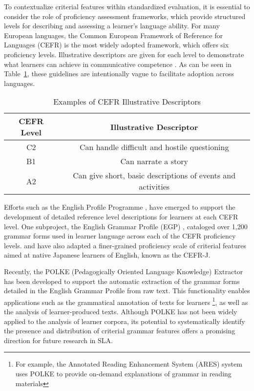 

To contextualize criterial features within standardized evaluation, it is essential to consider the role of
proficiency assessment frameworks, which provide structured levels for describing and assessing a learner's language
ability. For many European languages, the Common European Framework of Reference for Languages (CEFR) is the most
widely adopted framework, which offers six proficiency levels. Illustrative
descriptors are given for each level to demonstrate what learners can achieve in communicative
competence \citep{CEFR2020}. As can be seen in Table~\ref{tab:cefr-descriptors}, these guidelines are intentionally
vague to facilitate
adoption
across
languages.

\begin{table}
\centering
\begin{tabular}{cc}
\hline \textbf{CEFR Level} & \textbf{Illustrative Descriptor} \\ \hline
C2 & Can handle difficult and hostile questioning \\
B1  & Can narrate a story \\
A2 & Can give short, basic descriptions of events and activities \\
\hline
\end{tabular}
\caption{\label{tab:cefr-descriptors} Examples of CEFR Illustrative Descriptors}
\end{table}

Efforts such
as the English Profile Programme \citep{Saville2010}, have emerged to support the development of detailed reference
level
descriptions
for learners at each CEFR level. One subproject, the English Grammar Profile (EGP) \citep{okeeffe2017},
cataloged over 1,200 grammar forms used in learner language across each of the CEFR proficiency levels.
\citet{tono2018} and \citet{ishii2016} have
also adapted a
finer-grained
proficiency scale of criterial features aimed at native Japanese learners of English, known as the CEFR-J.

Recently, the POLKE (Pedagogically Oriented Language Knowledge) Extractor
\citep{POLKE} has been developed to support the automatic extraction of the grammar forms detailed in the English
Grammar
Profile from raw text. This functionality enables applications such as the grammatical annotation of texts for
learners
\footnote{For example, the Annotated Reading Enhancement System (ARES) \citep{lee2024} system uses POLKE to provide on-demand explanations of grammar in reading materials}, as well as the analysis of learner-produced texts. Although POLKE has not been widely applied to the analysis of learner corpora, its potential to systematically identify the presence and distribution of criterial grammar features offers a promising direction for future research in SLA.

